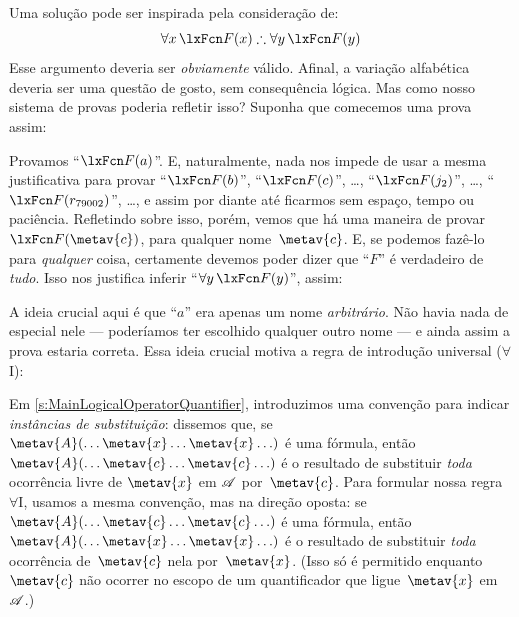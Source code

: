 Uma solução pode ser inspirada pela consideração de:
$$\forall x\,\atom{F}{x} \therefore \forall y\,\atom{F}{y}$$
Esse argumento deveria ser \emph{obviamente} válido. Afinal, a variação alfabética deveria ser uma questão de gosto, sem consequência lógica. Mas como nosso sistema de provas poderia refletir isso? Suponha que comecemos uma prova assim:
\begin{fitchproof}
	 \PR
	 
\end{fitchproof}
Provamos \textquotedblleft $\atom{F}{a}$\textquotedblright{}. E, naturalmente, nada nos impede de usar a mesma justificativa para provar \textquotedblleft $\atom{F}{b}$\textquotedblright{}, \textquotedblleft $\atom{F}{c}$\textquotedblright{}, \ldots, \textquotedblleft $\atom{F}{j_2}$\textquotedblright{}, \ldots, \textquotedblleft $\atom{F}{r_{79002}}$\textquotedblright{}, \dots, e assim por diante até ficarmos sem espaço, tempo ou paciência. Refletindo sobre isso, porém, vemos que há uma maneira de provar $\atom{F}{\metav{c}}$, para qualquer nome~$\metav{c}$. E, se podemos fazê-lo para \emph{qualquer} coisa, certamente devemos poder dizer que \textquotedblleft $F$\textquotedblright{} é verdadeiro de \emph{tudo}. Isso nos justifica inferir \textquotedblleft $\forall y\,\atom{F}{y}$\textquotedblright{}, assim:
\begin{fitchproof}
	\PR
	 
	 
\end{fitchproof}
A ideia crucial aqui é que \textquotedblleft $a$\textquotedblright{} era apenas um nome \emph{arbitrário}. Não havia nada de especial nele — poderíamos ter escolhido qualquer outro nome — e ainda assim a prova estaria correta. Essa ideia crucial motiva a regra de introdução universal ($\forall$I):

Em \cref{s:MainLogicalOperatorQuantifier}, introduzimos uma convenção
para indicar \emph{instâncias de substituição}: dissemos que, se
$\metav{A}(\ldots \metav{x} \ldots \metav{x}\ldots)$ é uma fórmula,
então $\metav{A}(\ldots \metav{c} \ldots \metav{c}\ldots)$ é o
resultado de substituir \emph{toda} ocorrência livre de $\metav{x}$ em
$\mathscr{A}$ por~$\metav{c}$. Para formular nossa regra $\forall$I, usamos
a mesma convenção, mas na direção oposta: se
$\metav{A}(\ldots \metav{c} \ldots \metav{c}\ldots)$ é uma fórmula,
então $\metav{A}(\ldots \metav{x} \ldots \metav{x}\ldots)$ é o
resultado de substituir \emph{toda} ocorrência de~$\metav{c}$ nela
por~$\metav{x}$. (Isso só é permitido enquanto $\metav{c}$ não
ocorrer no escopo de um quantificador que ligue~$\metav{x}$ em~$\mathscr{A}$.)

